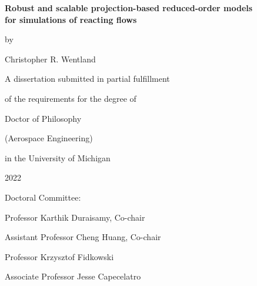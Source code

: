 \thispagestyle{empty}

\begin{singlespace}
\begin{center}

	\textbf{Robust and scalable projection-based reduced-order models \\for simulations of reacting flows}

	\vspace{2em}

	by

	\vspace{2em}

    Christopher R. Wentland

	\vspace{6em}

	A dissertation submitted in partial fulfillment

	of the requirements for the degree of

	Doctor of Philosophy

	(Aerospace Engineering)

	in the University of Michigan

	2022

\end{center}

\vspace{8em}

Doctoral Committee:

\vspace{1em}

\hspace{3em}Professor Karthik Duraisamy, Co-chair

\hspace{3em}Assistant Professor Cheng Huang, Co-chair

\hspace{3em}Professor Krzysztof Fidkowski

\hspace{3em}Associate Professor Jesse Capecelatro

\end{singlespace}
\restoregeometry